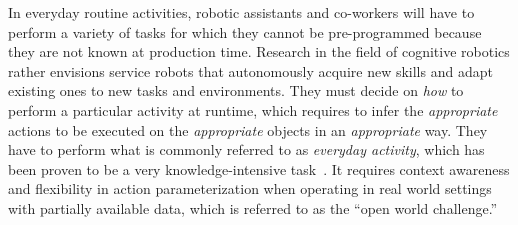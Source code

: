 \documentclass[oribibl]{llncs}
\begin{document}
In everyday routine activities, robotic assistants and co-workers 
will have to perform a variety of tasks for which they cannot be 
pre-programmed because they are not known at production time. 
Research in the field of cognitive robotics rather envisions service 
robots that autonomously acquire new skills and adapt existing ones 
to new tasks and environments. They must decide on \textit{how} to 
perform a particular activity at runtime, which requires to infer 
the \textit{appropriate} actions to be executed on the \textit 
{appropriate} objects in an \textit{appropriate} way. They have to 
perform what is commonly referred to as \textit{everyday activity}, 
which has been proven to be a very knowledge-intensive task~\cite 
{anderson95phd, nyga12actioncore}. It requires context awareness and 
flexibility in action parameterization when operating in real world 
settings with partially available data, which is referred to as the 
``open world challenge.'' 
\end{document}
